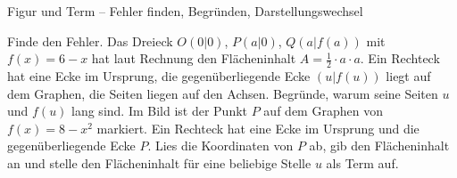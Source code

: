 \begin{aufgabe}{Figur und Term – Fehler finden, Begründen, Darstellungswechsel}
\begin{teile}
\teil Finde den Fehler. Das Dreieck $O(0 | 0)$, $P(a | 0)$, $Q(a | f(a))$ mit $f(x) = 6 - x$ hat laut Rechnung den Flächeninhalt $A = \tfrac{1}{2} \cdot a \cdot a$.
\teil Ein Rechteck hat eine Ecke im Ursprung, die gegenüberliegende Ecke $(u | f(u))$ liegt auf dem Graphen, die Seiten liegen auf den Achsen. Begründe, warum seine Seiten $u$ und $f(u)$ lang sind.
\teil Im Bild ist der Punkt $P$ auf dem Graphen von $f(x) = 8 - x^2$ markiert. Ein Rechteck hat eine Ecke im Ursprung und die gegenüberliegende Ecke $P$. Lies die Koordinaten von $P$ ab, gib den Flächeninhalt an und stelle den Flächeninhalt für eine beliebige Stelle $u$ als Term auf.

\begin{ksys}[xmin=-1,xmax=4,ymin=-1,ymax=9,ablesen]   \end{ksys}
\end{teile}
\end{aufgabe}
